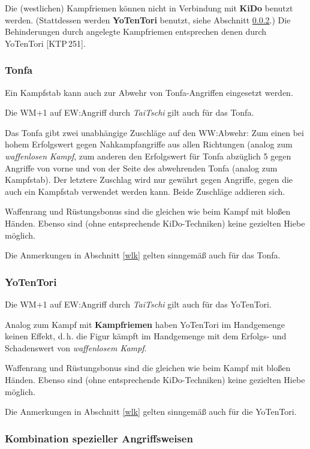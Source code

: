 \documentclass[10pt,a4paper,germanpar]{article}
\begin{document}
Die (westlichen) Kampfriemen können nicht in Verbindung mit
\textbf{KiDo} benutzt werden. (Stattdessen werden \textbf{YoTenTori}
benutzt, siehe Abschnitt \ref{yotentori}.) Die Behinderungen durch
angelegte Kampfriemen entsprechen denen durch YoTenTori [KTP\,251].

\subsubsection{Tonfa}

Ein Kampfstab kann auch zur Abwehr von Tonfa-Angriffen eingesetzt
werden.

Die WM+1 auf EW:Angriff durch \emph{TaiTschi} gilt auch für das Tonfa.

Das Tonfa gibt zwei unabhängige Zuschläge auf den WW:Abwehr: Zum einen
bei hohem Erfolgswert gegen Nahkampfangriffe aus allen Richtungen
(analog zum \emph{waffenlosen Kampf}, zum anderen den Erfolgswert für
Tonfa abzüglich 5 gegen Angriffe von vorne und von der Seite des
abwehrenden Tonfa (analog zum Kampfstab). Der letztere Zuschlag wird
nur gewährt gegen Angriffe, gegen die auch ein Kampfstab verwendet
werden kann. Beide Zuschläge addieren sich.

Waffenrang und Rüstungsbonus sind die gleichen wie beim Kampf mit
bloßen Händen. Ebenso sind (ohne entsprechende KiDo-Techniken) keine
gezielten Hiebe möglich.

Die Anmerkungen in Abschnitt \ref{wlk} gelten sinngemäß auch für das
Tonfa.

\subsubsection{YoTenTori}
\label{yotentori}

Die WM+1 auf EW:Angriff durch \emph{TaiTschi} gilt auch für das YoTenTori.

Analog zum Kampf mit \textbf{Kampfriemen} haben YoTenTori im
Handgemenge keinen Effekt, d.\,h. die Figur kämpft im Handgemenge mit
dem Erfolgs- und Schadenswert von \emph{waffenlosem Kampf}.

Waffenrang und Rüstungsbonus sind die gleichen wie beim Kampf mit
bloßen Händen. Ebenso sind (ohne entsprechende KiDo-Techniken) keine
gezielten Hiebe möglich.

Die Anmerkungen in Abschnitt \ref{wlk} gelten sinngemäß auch für die
YoTenTori.

\subsubsection{Kombination spezieller Angriffsweisen}
\label{kombi}
\end{document}
